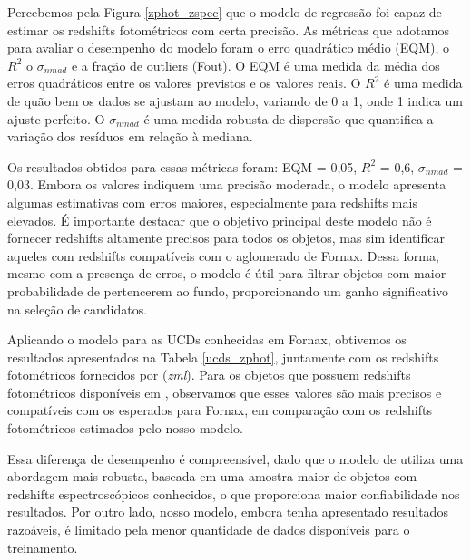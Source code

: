 Percebemos pela Figura \ref{zphot_zspec} que o modelo de regressão foi capaz de estimar os redshifts fotométricos com certa precisão. As métricas que adotamos para avaliar o desempenho do modelo foram o erro quadrático médio (EQM), o $R^2$ o $\sigma_{nmad}$ e a fração de outliers (Fout). O EQM é uma medida da média dos erros quadráticos entre os valores previstos e os valores reais. O $R^2$ é uma medida de quão bem os dados se ajustam ao modelo, variando de 0 a 1, onde 1 indica um ajuste perfeito. O $\sigma_{nmad}$ é uma medida robusta de dispersão que quantifica a variação dos resíduos em relação à mediana. 



Os resultados obtidos para essas métricas foram: EQM = 0,05, $R^2$ = 0,6, $\sigma_{nmad}$ = 0,03. Embora os valores indiquem uma precisão moderada, o modelo apresenta algumas estimativas com erros maiores, especialmente para redshifts mais elevados. É importante destacar que o objetivo principal deste modelo não é fornecer redshifts altamente precisos para todos os objetos, mas sim identificar aqueles com redshifts compatíveis com o aglomerado de Fornax. Dessa forma, mesmo com a presença de erros, o modelo é útil para filtrar objetos com maior probabilidade de pertencerem ao fundo, proporcionando um ganho significativo na seleção de candidatos.

Aplicando o modelo para as UCDs conhecidas em Fornax, obtivemos os resultados apresentados na Tabela \ref{ucds_zphot}, juntamente com os redshifts fotométricos fornecidos por \cite{erik_photoz_2024} (\textit{zml}). Para os objetos que possuem redshifts fotométricos disponíveis em \citep{erik_photoz_2024}, observamos que esses valores são mais precisos e compatíveis com os esperados para Fornax, em comparação com os redshifts fotométricos estimados pelo nosso modelo.

Essa diferença de desempenho é compreensível, dado que o modelo de \cite{erik_photoz_2024} utiliza uma abordagem mais robusta, baseada em uma amostra maior de objetos com redshifts espectroscópicos conhecidos, o que proporciona maior confiabilidade nos resultados. Por outro lado, nosso modelo, embora tenha apresentado resultados razoáveis, é limitado pela menor quantidade de dados disponíveis para o treinamento.

